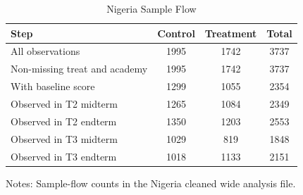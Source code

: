 \begin{table}[!htbp]
\centering
\caption{Nigeria Sample Flow}
\label{tab:ng_sampleflow}
\begin{threeparttable}
\begin{tabular}[t]{lccc}
\toprule
Step & Control & Treatment & Total \\
\midrule
All observations & 1995 & 1742 & 3737 \\
Non-missing treat and academy & 1995 & 1742 & 3737 \\
With baseline score & 1299 & 1055 & 2354 \\
Observed in T2 midterm & 1265 & 1084 & 2349 \\
Observed in T2 endterm & 1350 & 1203 & 2553 \\
Observed in T3 midterm & 1029 & 819 & 1848 \\
Observed in T3 endterm & 1018 & 1133 & 2151 \\
\bottomrule
\end{tabular}
\begin{tablenotes}[para]
\item Notes: Sample-flow counts in the Nigeria cleaned wide analysis file.
\end{tablenotes}
\end{threeparttable}
\end{table}

